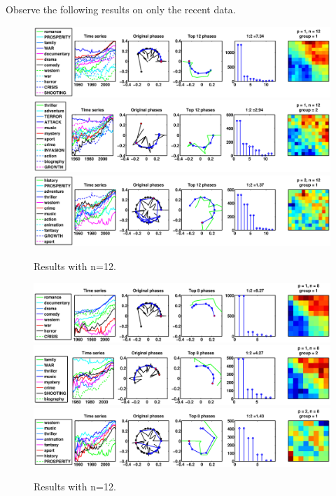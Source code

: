 \documentclass[11pt]{article}
\begin{document}
Observe the following results on only the recent data.

\begin{figure}[H]
\includegraphics[trim = 0 0 130 0, clip, width=\textwidth]{pictures/movie_word_data_1955-2015_p1_n12_gp1.eps}
\includegraphics[trim = 0 0 130 0, clip, width=\textwidth]{pictures/movie_word_data_1955-2015_p1_n12_gp2.eps}
\includegraphics[trim = 0 0 130 0, clip, width=\textwidth]{pictures/movie_word_data_1955-2015_p2_n12_gp1.eps}
\caption{Results with n=12.}
\end{figure}

\begin{figure}[H]
\includegraphics[trim = 0 0 130 0, clip, width=\textwidth]{pictures/movie_word_data_1955-2015_p1_n8_gp1.eps}
\includegraphics[trim = 0 0 130 0, clip, width=\textwidth]{pictures/movie_word_data_1955-2015_p1_n8_gp2.eps}
\includegraphics[trim = 0 0 130 0, clip, width=\textwidth]{pictures/movie_word_data_1955-2015_p2_n8_gp1.eps}
\caption{Results with n=12.}
\end{figure}
\end{document}
